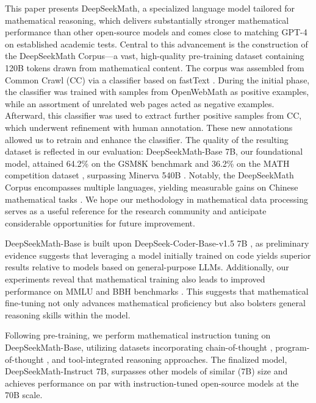 This paper presents DeepSeekMath, a specialized language model tailored for mathematical reasoning, which delivers substantially stronger mathematical performance than other open-source models and comes close to matching GPT-4 on established academic tests. Central to this advancement is the construction of the DeepSeekMath Corpus—a vast, high-quality pre-training dataset containing 120B tokens drawn from mathematical content. The corpus was assembled from Common Crawl (CC) via a classifier based on fastText \citep{joulin2016fasttext}. During the initial phase, the classifier was trained with samples from OpenWebMath \citep{openwebmath} as positive examples, while an assortment of unrelated web pages acted as negative examples. Afterward, this classifier was used to extract further positive samples from CC, which underwent refinement with human annotation. These new annotations allowed us to retrain and enhance the classifier. The quality of the resulting dataset is reflected in our evaluation: DeepSeekMath-Base 7B, our foundational model, attained 64.2\% on the GSM8K benchmark \citep{gsm8k} and 36.2\% on the MATH competition dataset \citep{MATH}, surpassing Minerva 540B \citep{minerva}. Notably, the DeepSeekMath Corpus encompasses multiple languages, yielding measurable gains on Chinese mathematical tasks \citep{wei2023cmath,agieval}. We hope our methodology in mathematical data processing serves as a useful reference for the research community and anticipate considerable opportunities for future improvement.

DeepSeekMath-Base is built upon DeepSeek-Coder-Base-v1.5 7B \citep{deepseek-coder}, as preliminary evidence suggests that leveraging a model initially trained on code yields superior results relative to models based on general-purpose LLMs. Additionally, our experiments reveal that mathematical training also leads to improved performance on MMLU \citep{mmlu} and BBH benchmarks \citep{bbh}. This suggests that mathematical fine-tuning not only advances mathematical proficiency but also bolsters general reasoning skills within the model.

Following pre-training, we perform mathematical instruction tuning on DeepSeekMath-Base, utilizing datasets incorporating chain-of-thought \citep{cot}, program-of-thought \citep{pot,pal}, and tool-integrated reasoning \citep{tora} approaches. The finalized model, DeepSeekMath-Instruct 7B, surpasses other models of similar (7B) size and achieves performance on par with instruction-tuned open-source models at the 70B scale.

